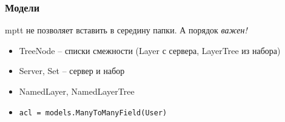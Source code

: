 \begin{frame}
  \frametitle{Модели}

  mptt не позволяет вставить в середину папки. А порядок \emph{важен!}

  \begin{itemize}
  \item TreeNode -- списки смежности (Layer с сервера, LayerTree из набора)
  \item Server, Set -- сервер и набор
  \item NamedLayer, NamedLayerTree
  \item \texttt{acl = models.ManyToManyField(User)}
  \end{itemize}
\end{frame}
